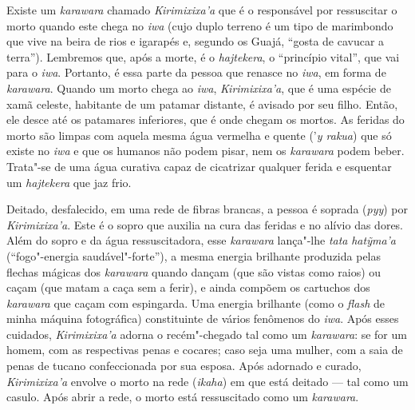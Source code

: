Existe um \emph{karawara} chamado \emph{Kirimixixa'a} que é o
responsável por ressuscitar o morto quando este chega no \emph{iwa}
(cujo duplo terreno é um tipo de marimbondo que vive na beira de rios e
igarapés e, segundo os Guajá, ``gosta de cavucar a terra''). Lembremos
que, após a morte, é o \emph{hajtekera}, o ``princípio vital'', que vai
para o \emph{iwa}. Portanto, é essa parte da pessoa que renasce no
\emph{iwa}, em forma de \emph{karawara}. Quando um morto chega ao
\emph{iwa}, \emph{Kirimixixa'a}, que é uma espécie de xamã celeste,
habitante de um patamar distante, é avisado por seu filho. Então, ele
desce até os patamares inferiores, que é onde chegam os mortos. As
feridas do morto são limpas com aquela mesma água vermelha e quente
('\emph{y rakua}) que só existe no \emph{iwa} e que os humanos não podem
pisar, nem os \emph{karawara} podem beber. Trata"-se de uma água curativa
capaz de cicatrizar qualquer ferida e esquentar um \emph{hajtekera} que
jaz frio.

Deitado, desfalecido, em uma rede de fibras brancas, a pessoa é soprada
(\emph{pyy}) por \emph{Kirimixixa'a}. Este é o sopro que auxilia na cura
das feridas e no alívio das dores. Além do sopro e da água
ressuscitadora, esse \emph{karawara} lança"-lhe \emph{tata}
\emph{hatỹma'a} (``fogo"-energia saudável"-forte''), a mesma energia
brilhante produzida pelas flechas mágicas dos \emph{karawara} quando
dançam (que são vistas como raios) ou caçam (que matam a caça sem a
ferir), e ainda compõem os cartuchos dos \emph{karawara} que caçam com
espingarda. Uma energia brilhante (como o \emph{flash} de minha máquina
fotográfica) constituinte de vários fenômenos do \emph{iwa}. Após esses
cuidados, \emph{Kirimixixa'a} adorna o recém"-chegado tal como um
\emph{karawara}: se for um homem, com as respectivas penas e cocares;
caso seja uma mulher, com a saia de penas de tucano confeccionada por
sua esposa. Após adornado e curado, \emph{Kirimixixa'a} envolve o morto
na rede (\emph{ikaha}) em que está deitado --- tal como um casulo. Após
abrir a rede, o morto está ressuscitado como um \emph{karawara}.

